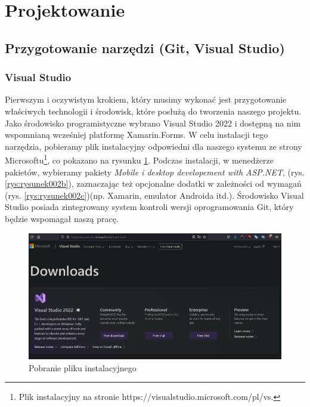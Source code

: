 	\newpage
\section{Projektowanie}		%

\subsection{Przygotowanie narzędzi (Git, Visual Studio)}		%

\subsubsection{Visual Studio} %
\hspace{0.60cm}Pierwszym i oczywistym krokiem, który musimy wykonać jest przygotowanie właściwych technologii i środowisk, które posłużą do tworzenia naszego projektu. Jako środowisko programistyczne wybrano Visual Studio 2022 i dostępną na nim wspomnianą wcześniej platformę Xamarin.Forms. W celu instalacji tego narzędzia, pobieramy plik instalacyjny odpowiedni dla naszego systemu ze strony Microsoftu\footnote{Plik instalacyjny na stronie  https://visualstudio.microsoft.com/pl/vs\cite{www1}.}, co pokazano na rysunku \ref{rys:rysunek002a}. Podczas instalacji, w menedżerze pakietów, wybieramy pakiety \textit{Mobile i desktop developement with ASP.NET}, (rys. \ref{rys:rysunek002b}), zaznaczając też opcjonalne dodatki w zależności od wymagań (rys. \ref{rys:rysunek002c})(np. Xamarin, emulator Androida itd.). Środowisko Visual Studio posiada zintegrowany system kontroli wersji oprogramowania Git, który będzie wspomagał naszą pracę.

\begin{figure}[!htb]
	\centering
	\includegraphics[width=0.8\linewidth]{rys/vs1.png}
	\caption{Pobranie pliku instalacyjnego}
	\label{rys:rysunek002a}
\end{figure}

